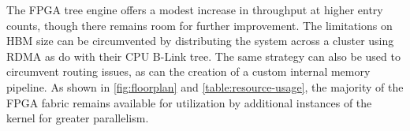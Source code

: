 
The FPGA tree engine offers a modest increase in throughput at higher entry
counts, though there remains room for further improvement. The limitations on
HBM size can be circumvented by distributing the system across a cluster using
RDMA as \citeauthor{base} do with their CPU B-Link tree. The same strategy can
also be used to circumvent routing issues, as can the creation of a custom
internal memory pipeline.
%
As shown in \autoref{fig:floorplan} and \autoref{table:resource-usage}, the
majority of the FPGA fabric remains available for utilization by additional
instances of the kernel for greater parallelism.
